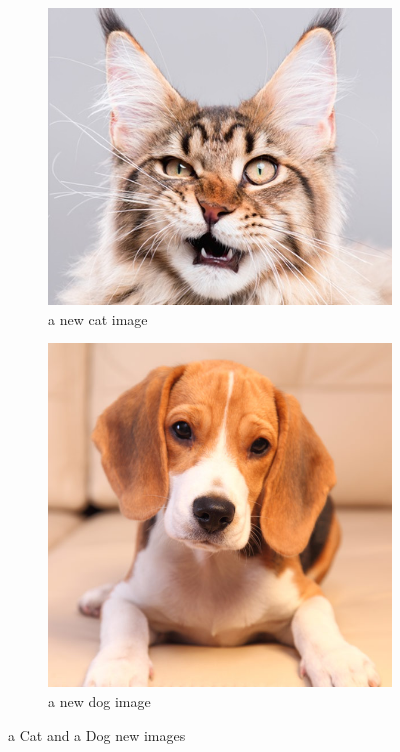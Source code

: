 \documentclass[a4paper]{iacas}
\begin{document}
\vskip 0.1in
\begin{figure}[!htbp]
	\begin{subfigure}{0.4\linewidth}
		\centering
		\includegraphics[width=\linewidth,scale=0.8]{imgs/cat.jpg}
		\caption{a new cat image}
	\end{subfigure}
	\begin{subfigure}{0.4\linewidth}
		\centering
		\includegraphics[width=\linewidth,scale=0.8]{imgs/dog.jpg}
		\caption{a new dog image}
	\end{subfigure}
	\caption{a Cat and a Dog new images}
	\label{a Cat and a Dog new images}
\end{figure}
\vskip 0.1in
\end{document}
